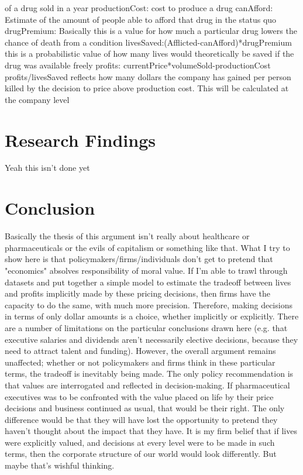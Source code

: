 \documentclass[12pt,english]{article} \usepackage{mathptmx}
\begin{document}
of a drug sold in a year productionCost: cost to produce a drug 
canAfford: Estimate of the amount of people able to afford that drug 
in the status quo drugPremium: Basically this is a value for how much 
a particular drug lowers the chance of death from a condition 
livesSaved:(Afflicted-canAfford)*drugPremium this is a probabilistic 
value of how many lives would theoretically be saved if the drug was 
available freely profits: currentPrice*volumeSold-productionCost 
profits/livesSaved reflects how many dollars the company has gained 
per person killed by the decision to price above production cost. 
This will be calculated at the company level \section{Research 
Findings}\label{sec:results} Yeah this isn't done yet 
\section{Conclusion}\label{sec:conclusion} Basically the thesis of 
this argument isn't really about healthcare or pharmaceuticals or the 
evils of capitalism or something like that. What I try to show here 
is that policymakers/firms/individuals don't get to pretend that 
"economics" absolves responsibility of moral value. If I'm able to 
trawl through datasets and put together a simple model to estimate 
the tradeoff between lives and profits implicitly made by these 
pricing decisions, then firms have the capacity to do the same, with 
much more precision. Therefore, making decisions in terms of only 
dollar amounts is a choice, whether implicitly or explicitly. There 
are a number of limitations on the particular conclusions drawn here 
(e.g. that executive salaries and dividends aren't necessarily 
elective decisions, because they need to attract talent and funding). 
However, the overall argument remains unaffected; whether or not 
policymakers and firms think in these particular terms, the tradeoff 
is inevitably being made. The only policy recommendation is that 
values are interrogated and reflected in decision-making. If 
pharmaceutical executives was to be confronted with the value placed 
on life by their price decisions and business continued as usual, 
that would be their right. The only difference would be that they 
will have lost the opportunity to pretend they haven't thought about 
the impact that they have. It is my firm belief that if lives were 
explicitly valued, and decisions at every level were to be made in 
such terms, then the corporate structure of our world would look 
differently. But maybe that's wishful thinking. \vfill \pagebreak{} 
  
\end{document}

